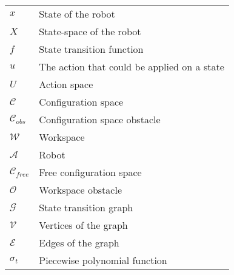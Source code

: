 \begin{table}[h!]
\begin{tabular}{ll}
$x$ &State of the robot\\
$X$ &State-space of the robot\\
$f$ &State transition function\\
$u$ &The action that could be applied on a state\\
$U$ &Action space\\
$\mathcal{C}$ &Configuration space\\
$\mathcal{C}_{obs}$ &Configuration space obstacle\\
$\mathcal{W}$ &Workspace\\
$\mathcal{A}$ &Robot\\
$\mathcal{C}_{free}$ &Free configuration space\\
$\mathcal{O}$ &Workspace obstacle\\
$\mathcal{G}$ &State transition graph\\
$\mathcal{V}$ &Vertices of the graph\\
$\mathcal{E}$ &Edges of the graph\\
$\sigma_t$ & Piecewise polynomial function\\
\end{tabular}
\end{table}
